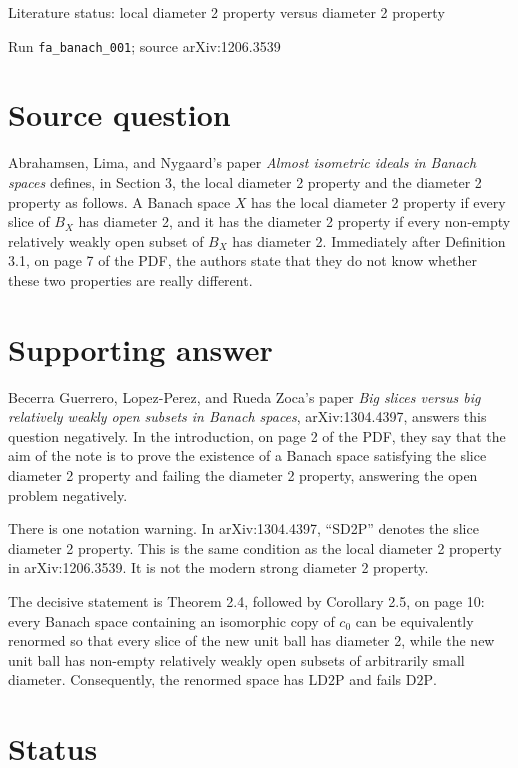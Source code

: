 \documentclass[11pt]{article}
\newcommand{\LDTP}{\mathrm{LD2P}}
\newcommand{\DTP}{\mathrm{D2P}}
\newcommand{\cnull}{c_0}
\begin{document}
\begin{center}
{\Large Literature status: local diameter 2 property versus diameter 2 property}

\medskip
{\small Run \texttt{fa\_banach\_001}; source arXiv:1206.3539}
\end{center}

\section*{Source question}

Abrahamsen, Lima, and Nygaard's paper \emph{Almost isometric ideals in Banach
spaces} defines, in Section 3, the local diameter 2 property and the diameter
2 property as follows. A Banach space \(X\) has the local diameter 2 property
if every slice of \(B_X\) has diameter 2, and it has the diameter 2 property
if every non-empty relatively weakly open subset of \(B_X\) has diameter 2.
Immediately after Definition 3.1, on page 7 of the PDF, the authors state
that they do not know whether these two properties are really different.

\section*{Supporting answer}

Becerra Guerrero, Lopez-Perez, and Rueda Zoca's paper \emph{Big slices versus
big relatively weakly open subsets in Banach spaces}, arXiv:1304.4397, answers
this question negatively. In the introduction, on page 2 of the PDF, they say
that the aim of the note is to prove the existence of a Banach space satisfying
the slice diameter 2 property and failing the diameter 2 property, answering
the open problem negatively.

There is one notation warning. In arXiv:1304.4397, ``SD2P'' denotes the
slice diameter 2 property. This is the same condition as the local diameter 2
property in arXiv:1206.3539. It is not the modern strong diameter 2 property.

The decisive statement is Theorem 2.4, followed by Corollary 2.5, on page 10:
every Banach space containing an isomorphic copy of \(\cnull\) can be
equivalently renormed so that every slice of the new unit ball has diameter
2, while the new unit ball has non-empty relatively weakly open subsets of
arbitrarily small diameter. Consequently, the renormed space has \(\LDTP\)
and fails \(\DTP\).

\section*{Status}
\end{document}
